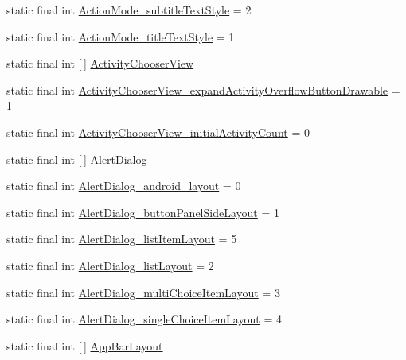 \begin{DoxyCompactItemize}
\item 
static final int \hyperlink{classproject4_1_1xaria_1_1R_1_1styleable_a1883dbad4265d780ae2a5d8c6b695982}{Action\+Mode\+\_\+subtitle\+Text\+Style} = 2
\item 
static final int \hyperlink{classproject4_1_1xaria_1_1R_1_1styleable_ac6453b7ab2d44d00d3056c12483f92cb}{Action\+Mode\+\_\+title\+Text\+Style} = 1
\item 
static final int \mbox{[}$\,$\mbox{]} \hyperlink{classproject4_1_1xaria_1_1R_1_1styleable_a0e91fbde63d227499bc31d982f4a1131}{Activity\+Chooser\+View}
\item 
static final int \hyperlink{classproject4_1_1xaria_1_1R_1_1styleable_a0bd7975ed1058630234848e0f2e49130}{Activity\+Chooser\+View\+\_\+expand\+Activity\+Overflow\+Button\+Drawable} = 1
\item 
static final int \hyperlink{classproject4_1_1xaria_1_1R_1_1styleable_aa4cf4c159c65ab0d4b684efed6e9841d}{Activity\+Chooser\+View\+\_\+initial\+Activity\+Count} = 0
\item 
static final int \mbox{[}$\,$\mbox{]} \hyperlink{classproject4_1_1xaria_1_1R_1_1styleable_a03310da91bbeadbad8196e09427a2ba7}{Alert\+Dialog}
\item 
static final int \hyperlink{classproject4_1_1xaria_1_1R_1_1styleable_a9953878a870cb4fabdb2e6d4052b6592}{Alert\+Dialog\+\_\+android\+\_\+layout} = 0
\item 
static final int \hyperlink{classproject4_1_1xaria_1_1R_1_1styleable_a1833a885cce0614ceaed95c1792d8bb6}{Alert\+Dialog\+\_\+button\+Panel\+Side\+Layout} = 1
\item 
static final int \hyperlink{classproject4_1_1xaria_1_1R_1_1styleable_ab18f2ebca215c3b56455c5bf016daed3}{Alert\+Dialog\+\_\+list\+Item\+Layout} = 5
\item 
static final int \hyperlink{classproject4_1_1xaria_1_1R_1_1styleable_a263c5c915bd8c850ce36810a7867291f}{Alert\+Dialog\+\_\+list\+Layout} = 2
\item 
static final int \hyperlink{classproject4_1_1xaria_1_1R_1_1styleable_a8c3f104371ce0fd47e43a3202a641816}{Alert\+Dialog\+\_\+multi\+Choice\+Item\+Layout} = 3
\item 
static final int \hyperlink{classproject4_1_1xaria_1_1R_1_1styleable_a9b45eea7b3a28fece617988bdf526ee4}{Alert\+Dialog\+\_\+single\+Choice\+Item\+Layout} = 4
\item 
static final int \mbox{[}$\,$\mbox{]} \hyperlink{classproject4_1_1xaria_1_1R_1_1styleable_aff523d344137cf82b06e00b519e99093}{App\+Bar\+Layout}
\item 

\end{DoxyCompactItemize}
